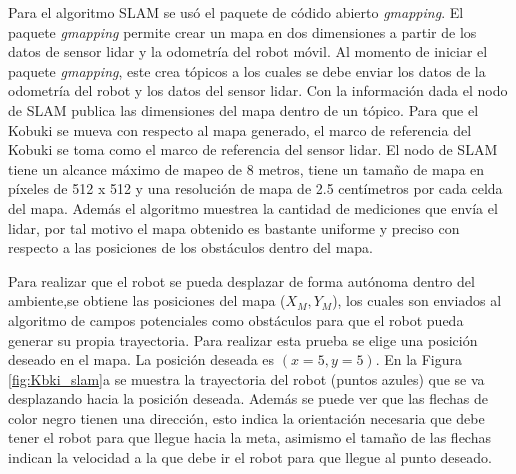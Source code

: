 
Para el algoritmo SLAM se usó el paquete de códido abierto \textit{gmapping}. El paquete 
\textit{gmapping} permite crear un mapa en dos dimensiones a partir de los datos de sensor 
lidar y la odometría del robot móvil. Al momento de iniciar el paquete \textit{gmapping}, 
este crea tópicos a los cuales se debe enviar los datos de la odometría del robot y los datos 
del sensor lidar. Con la información dada el nodo de SLAM publica las dimensiones del mapa 
dentro de un tópico. Para que el Kobuki se mueva con respecto al mapa generado, el marco de 
referencia del Kobuki se toma como el marco de referencia del sensor lidar. El nodo de 
SLAM tiene un alcance máximo de mapeo de 8 metros, tiene un tamaño de mapa en píxeles de 
512 x 512 y una resolución de mapa de 2.5 centímetros por cada celda del mapa. Además el 
algoritmo muestrea la cantidad de mediciones que envía el lidar, por tal motivo el mapa 
obtenido es bastante uniforme y preciso con respecto a las posiciones de los obstáculos 
dentro del mapa. 

Para  realizar que el robot se pueda desplazar de forma autónoma dentro del ambiente,se 
obtiene las posiciones del mapa ($X_{M}, Y_{M}$), los cuales son enviados al algoritmo 
de campos potenciales como obstáculos para que el robot pueda generar su propia 
trayectoria. Para realizar esta prueba se elige una posición deseado en el mapa. La 
posición deseada es $(x = 5, y = 5)$. En la Figura \ref{fig:Kbki_slam}a se muestra 
la trayectoria del robot (puntos azules) que se va desplazando hacia la posición 
deseada. Además se puede ver que las flechas de color negro tienen una dirección, esto
indica la orientación necesaria que debe tener el robot para que llegue hacia la meta, 
asimismo el tamaño de las flechas indican la velocidad a la que debe ir el robot para 
que llegue al punto deseado. 

